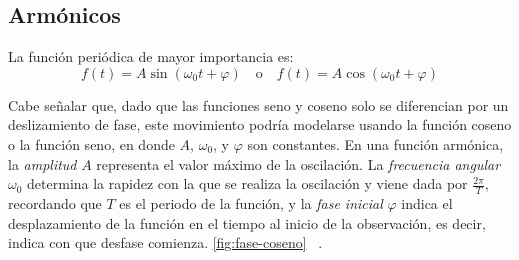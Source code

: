 \subsection{Armónicos}
La función periódica de mayor importancia es:
\begin{equation}
	f(t) = A \sin(\omega_0 t + \varphi) \quad \text{o} \quad f(t) = A \cos(\omega_0 t + \varphi)
\end{equation}

Cabe señalar que, dado que las funciones seno y coseno solo se diferencian por un deslizamiento de fase, este movimiento podría modelarse usando la función coseno o la función seno, en donde \(A\), \(\omega_0\), y \(\varphi\) son constantes. En una función armónica, la \textit{amplitud} \(A\) representa el valor máximo de la oscilación. La \textit{frecuencia angular} \(\omega_0\) determina la rapidez con la que se realiza la oscilación y viene dada por $\frac{2\pi}{T}$, recordando que $T$ es el periodo de la función, y la \textit{fase inicial} \(\varphi\) indica el desplazamiento de la función en el tiempo al inicio de la observación, es decir, indica con que desfase comienza. \ref{fig:fase-coseno} ~\cite{armonicosOpenStax}. 

